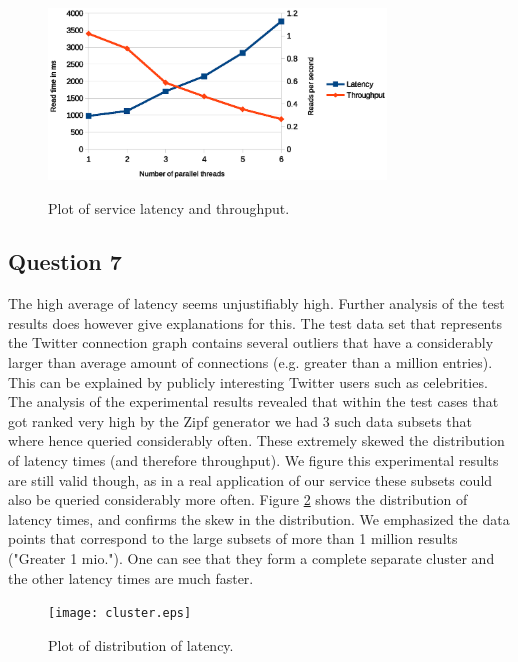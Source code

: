 \documentclass[12pt,a4paper]{article}
\begin{document}
\begin{figure}
\centering
  \includegraphics[width=0.8\textwidth]{latencythroughput.eps}\\
  \caption{Plot of service latency and throughput.}
  \label{fig:latecnythroughput}
\end{figure}


\subsection*{Question 7}
\label{sec:pq7} 

The high average of latency seems unjustifiably high. Further analysis of the test results does however give explanations for this. The test data set that represents the Twitter connection graph contains several outliers that have a considerably larger than average amount of connections (e.g. greater than a million entries). This can be explained by publicly interesting Twitter users such as celebrities. The analysis of the experimental results revealed that within the test cases that got ranked very high by the Zipf generator we had 3 such data subsets that where hence queried considerably often. These extremely skewed the distribution of latency times (and therefore throughput). We figure this experimental results are still valid though, as in a real application of our service these subsets could also be queried considerably more often. Figure \ref{fig:cluster} shows the distribution of latency times, and confirms the skew in the distribution. We emphasized the data points that correspond to the large subsets of more than 1 million results ("Greater 1 mio."). One can see that they form a complete separate cluster and the other latency times are much faster.

\begin{figure}
\centering
  \texttt{[image: cluster.eps]}\\
  \caption{Plot of distribution of latency.}
  \label{fig:cluster}
\end{figure}
\end{document}
